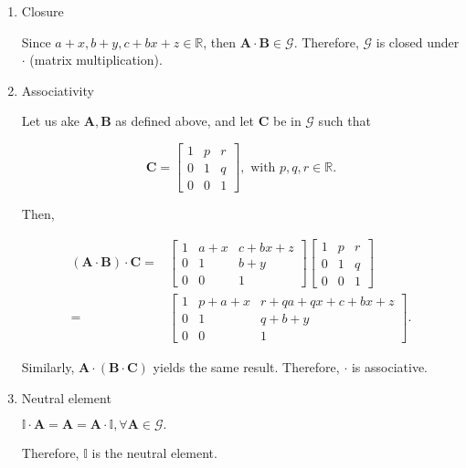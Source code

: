 \documentclass{article}
\def\ma{{\bm{A}}}
\def\mb{{\bm{B}}}
\def\mc{{\bm{C}}}
\def\R{{\mathbb{R}}}
\def\I{{\mathbb{I}}}
\begin{document}
\begin{enumerate}
    \item Closure
    
    Since $a + x, b + y, c + bx + z \in \R$, then $\ma \cdot \mb \in \mathcal{G}$. Therefore, $\mathcal{G}$ is closed under $\cdot$ (matrix multiplication).
    
    \item Associativity
    
    Let us ake $\ma, \mb$ as defined above, and let $\mc$ be in $\mathcal{G}$ such that
    
    \[
    \mc = \begin{bmatrix}
        1 & p & r\\
        0 & 1 & q\\
        0 & 0 & 1
    \end{bmatrix},\text{ with } p, q, r \in \R.
    \]
    
    Then,
    
    \begin{equation}
    \begin{split}
    (\ma \cdot \mb) \cdot \mc = & \begin{bmatrix}
        1 & a + x & c + bx + z\\
        0 & 1 & b + y\\
        0 & 0 & 1
    \end{bmatrix}\begin{bmatrix}
        1 & p & r\\
        0 & 1 & q\\
        0 & 0 & 1
    \end{bmatrix}\\ = & \begin{bmatrix}
        1 & p + a + x & r + qa + qx + c + bx + z\\
        0 & 1 & q + b + y\\
        0 & 0 & 1
    \end{bmatrix}.
    \end{split}
    \end{equation}
    
    Similarly, $\ma \cdot (\mb \cdot \mc)$ yields the same result. Therefore, $\cdot$ is associative.
    
    \item Neutral element
    
    $\I \cdot \ma = \ma = \ma \cdot \I, \forall \ma \in \mathcal{G}.$
    
    Therefore, $\I$ is the neutral element.
    

\end{enumerate}
\end{document}
